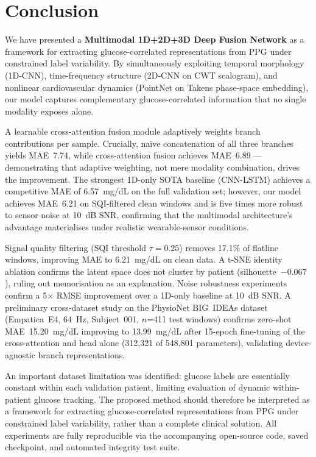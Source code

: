 \documentclass[conference]{IEEEtran}
\begin{document}
\section{Conclusion}
\label{sec:conclusion}

We have presented a \textbf{Multimodal 1D+2D+3D Deep Fusion Network} as a
framework for extracting glucose-correlated representations from PPG under
constrained label variability.  By simultaneously
exploiting temporal morphology (1D-CNN), time-frequency structure (2D-CNN on
CWT scalogram), and nonlinear cardiovascular dynamics (PointNet on Takens
phase-space embedding), our model captures complementary glucose-correlated
information that no single modality exposes alone.

A learnable cross-attention fusion module adaptively weights branch contributions
per sample.  Crucially, na\"ive concatenation of all three branches yields
MAE~7.74, while cross-attention fusion achieves MAE~6.89 --- demonstrating
that adaptive weighting, not mere modality combination, drives the improvement.
The strongest 1D-only SOTA baseline (CNN-LSTM) achieves a competitive MAE of
6.57~mg/dL on the full validation set; however, our model achieves MAE~6.21
on SQI-filtered clean windows and is five times more robust to sensor noise at
10~dB SNR, confirming that the multimodal architecture's advantage materialises
under realistic wearable-sensor conditions.

Signal quality filtering (SQI threshold $\tau=0.25$) removes 17.1\% of
flatline windows, improving MAE to 6.21~mg/dL on clean data.
A t-SNE identity ablation confirms the latent space does not cluster by
patient (silhouette~$-0.067$), ruling out memorisation as an explanation.
Noise robustness experiments confirm a 5$\times$ RMSE improvement over a
1D-only baseline at 10~dB SNR.
A preliminary cross-dataset study on the PhysioNet BIG~IDEAs dataset
(Empatica~E4, 64~Hz, Subject~001, $n$=411 test windows) confirms zero-shot
MAE~15.20~mg/dL improving to 13.99~mg/dL after 15-epoch fine-tuning of the
cross-attention and head alone (312,321 of 548,801 parameters), validating
device-agnostic branch representations.

An important dataset limitation was identified: glucose labels are essentially
constant within each validation patient, limiting evaluation of dynamic
within-patient glucose tracking.
The proposed method should therefore be interpreted as a framework for
extracting glucose-correlated representations from PPG under constrained
label variability, rather than a complete clinical solution.
All experiments are fully reproducible via the accompanying open-source code,
saved checkpoint, and automated integrity test suite.
\end{document}
